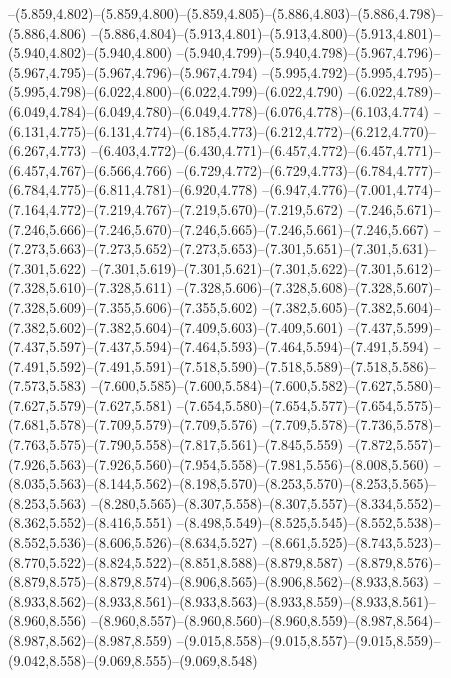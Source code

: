   --(5.859,4.802)--(5.859,4.800)--(5.859,4.805)--(5.886,4.803)--(5.886,4.798)--(5.886,4.806)%
  --(5.886,4.804)--(5.913,4.801)--(5.913,4.800)--(5.913,4.801)--(5.940,4.802)--(5.940,4.800)%
  --(5.940,4.799)--(5.940,4.798)--(5.967,4.796)--(5.967,4.795)--(5.967,4.796)--(5.967,4.794)%
  --(5.995,4.792)--(5.995,4.795)--(5.995,4.798)--(6.022,4.800)--(6.022,4.799)--(6.022,4.790)%
  --(6.022,4.789)--(6.049,4.784)--(6.049,4.780)--(6.049,4.778)--(6.076,4.778)--(6.103,4.774)%
  --(6.131,4.775)--(6.131,4.774)--(6.185,4.773)--(6.212,4.772)--(6.212,4.770)--(6.267,4.773)%
  --(6.403,4.772)--(6.430,4.771)--(6.457,4.772)--(6.457,4.771)--(6.457,4.767)--(6.566,4.766)%
  --(6.729,4.772)--(6.729,4.773)--(6.784,4.777)--(6.784,4.775)--(6.811,4.781)--(6.920,4.778)%
  --(6.947,4.776)--(7.001,4.774)--(7.164,4.772)--(7.219,4.767)--(7.219,5.670)--(7.219,5.672)%
  --(7.246,5.671)--(7.246,5.666)--(7.246,5.670)--(7.246,5.665)--(7.246,5.661)--(7.246,5.667)%
  --(7.273,5.663)--(7.273,5.652)--(7.273,5.653)--(7.301,5.651)--(7.301,5.631)--(7.301,5.622)%
  --(7.301,5.619)--(7.301,5.621)--(7.301,5.622)--(7.301,5.612)--(7.328,5.610)--(7.328,5.611)%
  --(7.328,5.606)--(7.328,5.608)--(7.328,5.607)--(7.328,5.609)--(7.355,5.606)--(7.355,5.602)%
  --(7.382,5.605)--(7.382,5.604)--(7.382,5.602)--(7.382,5.604)--(7.409,5.603)--(7.409,5.601)%
  --(7.437,5.599)--(7.437,5.597)--(7.437,5.594)--(7.464,5.593)--(7.464,5.594)--(7.491,5.594)%
  --(7.491,5.592)--(7.491,5.591)--(7.518,5.590)--(7.518,5.589)--(7.518,5.586)--(7.573,5.583)%
  --(7.600,5.585)--(7.600,5.584)--(7.600,5.582)--(7.627,5.580)--(7.627,5.579)--(7.627,5.581)%
  --(7.654,5.580)--(7.654,5.577)--(7.654,5.575)--(7.681,5.578)--(7.709,5.579)--(7.709,5.576)%
  --(7.709,5.578)--(7.736,5.578)--(7.763,5.575)--(7.790,5.558)--(7.817,5.561)--(7.845,5.559)%
  --(7.872,5.557)--(7.926,5.563)--(7.926,5.560)--(7.954,5.558)--(7.981,5.556)--(8.008,5.560)%
  --(8.035,5.563)--(8.144,5.562)--(8.198,5.570)--(8.253,5.570)--(8.253,5.565)--(8.253,5.563)%
  --(8.280,5.565)--(8.307,5.558)--(8.307,5.557)--(8.334,5.552)--(8.362,5.552)--(8.416,5.551)%
  --(8.498,5.549)--(8.525,5.545)--(8.552,5.538)--(8.552,5.536)--(8.606,5.526)--(8.634,5.527)%
  --(8.661,5.525)--(8.743,5.523)--(8.770,5.522)--(8.824,5.522)--(8.851,8.588)--(8.879,8.587)%
  --(8.879,8.576)--(8.879,8.575)--(8.879,8.574)--(8.906,8.565)--(8.906,8.562)--(8.933,8.563)%
  --(8.933,8.562)--(8.933,8.561)--(8.933,8.563)--(8.933,8.559)--(8.933,8.561)--(8.960,8.556)%
  --(8.960,8.557)--(8.960,8.560)--(8.960,8.559)--(8.987,8.564)--(8.987,8.562)--(8.987,8.559)%
  --(9.015,8.558)--(9.015,8.557)--(9.015,8.559)--(9.042,8.558)--(9.069,8.555)--(9.069,8.548)%
